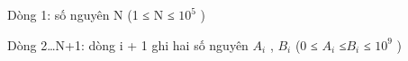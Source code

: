 Dòng 1: số nguyên N (1 ≤ N ≤ $10^{5}$ )

Dòng 2…N+1: dòng i + 1 ghi hai số nguyên $A_{i}$ , $B_{i}$ (0 ≤ $A_{i}$ ≤$B_{i}$ ≤ $10^{9}$ )